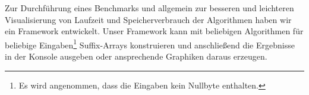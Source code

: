 Zur  Durchführung eines Benchmarks und allgemein zur besseren und leichteren
Visualisierung von Laufzeit und Speicherverbrauch der Algorithmen haben wir ein Framework entwickelt.
Unser Framework kann mit beliebigen Algorithmen für beliebige Eingaben\footnote{Es wird angenommen,
dass die Eingaben kein Nullbyte enthalten.} Suffix-Arrays konstruieren und
anschließend die Ergebnisse in der Konsole ausgeben oder ansprechende Graphiken daraus erzeugen.
